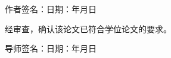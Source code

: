\begin{center}
  {\songti 作者签名：\hspace{50mm}日期：\hspace{6mm}年\hspace{6mm}月\hspace{6mm}日}
\end{center}

\vspace{8mm}

{\songti 经审查，确认该论文已符合\schoolName \zufeDegreeName 学位论文的要求。\par}

\vspace{12mm}

\begin{center}
  {\songti 导师签名：\hspace{50mm}日期：\hspace{6mm}年\hspace{6mm}月\hspace{6mm}日}
\end{center}

\newpage
